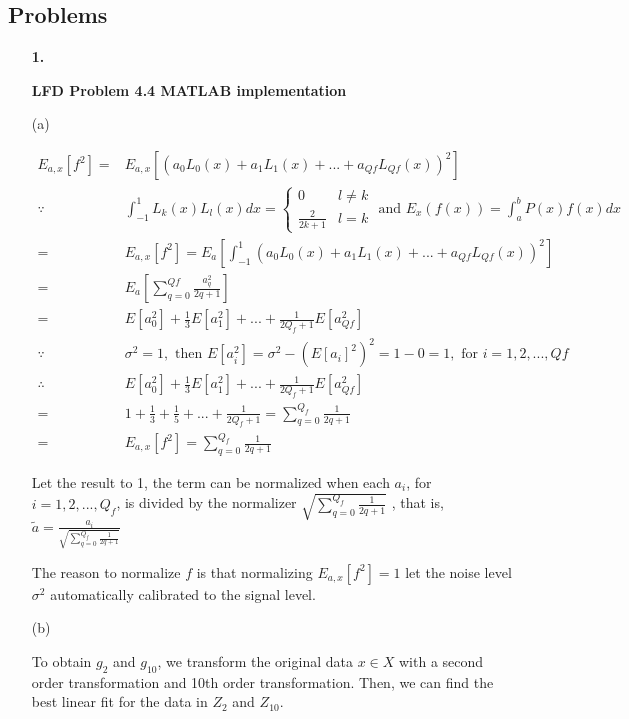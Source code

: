 \documentclass[11pt]{article}
\begin{document}
\subsection * {Problems}

\begin{enumerate}

\item [\textbf{1.}]  

\textbf{LFD Problem 4.4 MATLAB implementation}

(a)

\begin{equation}
\begin{aligned}
E_{a,x}[f^2] =& E_{a,x}[(a_0L_0(x) + a_1L_1(x) + ... + a_{Qf}L_{Qf}(x))^2]\\
\because & \int_{-1}^{1} L_k(x)L_l(x)dx 
= \begin{cases}
0 & \text{$l \neq k$}\\
\frac{2}{2k+1} & \text{$l = k$}
\end{cases}
\text{ and } E_x(f(x)) = \int_{a}^{b} P(x)f(x)dx\\
=& E_{a,x} [f^2] = E_a[\int_{-1}^{1}(a_0L_0(x) + a_1L_1(x) + ... + a_{Qf}L_{Qf}(x))^2]\\
=& E_a[\sum_{q=0}^{Qf}\frac{a_q^2}{2q+1}]\\
=& E[a_0^2] + \frac{1}{3}E[a_1^2] + ... + \frac{1}{2Q_f+1}E[a_{Qf}^2]\\
\because & \sigma^2 = 1, \text{ then } E[a_i^2] = \sigma^2 - (E[a_i]^2)^2 = 1 - 0 = 1, \text{ for } i = 1, 2, ..., Qf\\
\therefore & E[a_0^2] + \frac{1}{3}E[a_1^2] + ... + \frac{1}{2Q_f+1}E[a_{Qf}^2] \\
=& 1 + \frac{1}{3} + \frac{1}{5} + ... + \frac{1}{2Q_f+1} = \sum_{q=0}^{Q_f} \frac{1}{2q+1}\\
=& E_{a,x}[f^2] = \sum_{q=0}^{Q_f} \frac{1}{2q+1}
\end{aligned}
\end{equation}

Let the result to 1, the term can be normalized when each $a_i$, for $ i = 1, 2, ..., Q_f$, is divided by the normalizer $\sqrt{\sum_{q=0}^{Q_f}\frac{1}{2q+1}}$ , that is, $\tilde{a} = \frac{a_i}{\sqrt{\sum_{q=0}^{Q_f}\frac{1}{2q+1}}}$

The reason to normalize $f$ is that normalizing $E_{a,x}[f^2] = 1$ let the noise level $\sigma^2$ automatically calibrated to the signal level.

(b)

To obtain $g_2$ and $g_10$, we transform the original data $x \in X$ with a second order transformation and 10th order transformation. Then, we can find the best linear fit for the data in $Z_2$ and $Z_{10}$.


\end{enumerate}
\end{document}
